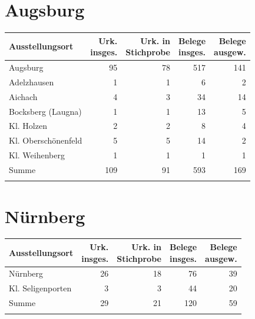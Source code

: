 
\section{Augsburg}

\begin{tabularx}{\linewidth}{X r r r r}
\lsptoprule
Ausstellungsort
	& \makecell{Urk.\\ insges.}
	& \makecell{Urk. in\\ Stichprobe}
	& \makecell{Belege\\ insges.}
	& \makecell{Belege\\ ausgew.}
	\\
\midrule

Augsburg
	& 95
	& 78
	& 517
	& 141
	\\

Adelzhausen
	& 1
	& 1
	& 6
	& 2
	\\

Aichach
	& 4
	& 3
	& 34
	& 14
	\\

Bocksberg (Laugna)
	& 1
	& 1
	& 13
	& 5
	\\

Kl. Holzen
	& 2
	& 2
	& 8
	& 4
	\\

Kl. Oberschönenfeld
	& 5
	& 5
	& 14
	& 2
	\\

Kl. Weihenberg
	& 1
	& 1
	& 1
	& 1
	\\

\midrule

Summe
	& 109
	& 91
	& 593
	& 169
	\\

\lspbottomrule
\end{tabularx}


\section{Nürnberg}

\begin{tabularx}{\linewidth}{X r r r r}
\lsptoprule
Ausstellungsort
	& \makecell{Urk.\\ insges.}
	& \makecell{Urk. in\\ Stichprobe}
	& \makecell{Belege\\ insges.}
	& \makecell{Belege\\ ausgew.}
	\\
\midrule

Nürnberg
	& 26
	& 18
	& 76
	& 39
	\\

Kl. Seligenporten
	& 3
	& 3
	& 44
	& 20
	\\

\midrule

Summe
	& 29
	& 21
	& 120
	& 59
	\\

\lspbottomrule
\end{tabularx}

